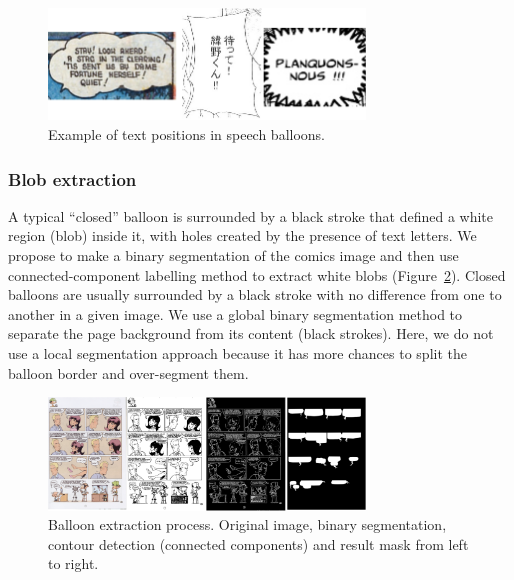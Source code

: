 	\begin{figure}[h!]	%
	  \centering
		\includegraphics[trim= 0px 0px 0px 0px, clip, width=0.75\textwidth]{text_in_balloon.png}
		\caption[Text positions in speech balloons]{Example of text positions in speech balloons.}
		\label{fig:se:text_in_balloon}
	\end{figure}

\subsubsection{Blob extraction} %
\label{par:blob_extraction}

A typical ``closed'' balloon is surrounded by a black stroke that defined a white region (blob) inside it, with holes created by the presence of text letters.
We propose to make a binary segmentation of the comics image and then use connected-component labelling method to extract white blobs (Figure~\ref{fig:se:closed_balloon}).
Closed balloons are usually surrounded by a black stroke with no difference from one to another in a given image.
We use a global binary segmentation method to separate the page background from its content (black strokes).
Here, we do not use a local segmentation approach because it has more chances to split the balloon border and over-segment them.

	\begin{figure}[h!]	%
	  \centering
		\includegraphics[trim= 0px 0px 0px 0px, clip, width=0.75\textwidth]{closed_balloon_process.png}
		\caption[Sequential balloon extraction process illustration]{Balloon extraction process. Original image, binary segmentation, contour detection (connected components) and result mask from left to right.}
		\label{fig:se:closed_balloon}
	\end{figure}


